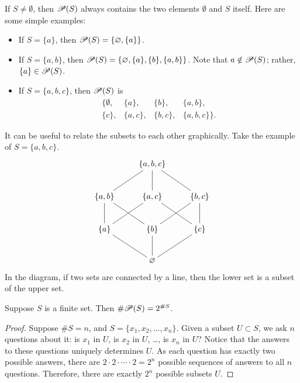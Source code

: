 \documentclass{tufte-book}
\begin{document}
If $S \neq \emptyset$, then $\mathscr{P}(S)$ always contains the two elements $\emptyset$ and $S$ itself. Here are some simple examples:
\begin{itemize}
    \item If $S = \{a\}$, then $\mathscr{P}(S) = \{\varnothing, \{a\}\}$.
    \item If $S = \{a, b\}$, then $\mathscr{P}(S) = \{\varnothing, \{a\}, \{b\}, \{a, b\}\}$. Note that $a \notin \mathscr{P}(S)$; rather, $\{a\} \in \mathscr{P}(S)$.
    \item If $S = \{a, b, c\}$, then $\mathscr{P}(S)$ is
  \[
  \begin{array}{cccc}
    \{\emptyset, & \{a\}, & \{b\}, & \{a, b\}, \\
    \{c\}, & \{a, c\}, & \{b, c\}, & \{a, b, c\}\}.
  \end{array}
  \]
\end{itemize}
It can be useful to relate the subsets to each other graphically. Take the example of $S = \{a, b, c\}$. 
\[
\xymatrix{
  & \{a, b, c\} \ar@{-}[dl] \ar@{-}[d] \ar@{-}[dr] & \\
  \{a, b\} \ar@{-}[d] \ar@{-}[dr] & \{a, c\} \ar@{-}[dl] \ar@{-}[dr] & \{b, c\} \ar@{-}[dl] \ar@{-}[d]\\
  \{a\} \ar@{-}[dr] & \{b\} \ar@{-}[d] & \{c\} \ar@{-}[dl] \\
  & \emptyset &
}
\]
In the diagram, if two sets are connected by a line, then the lower set is a subset of the upper set.

\begin{proposition}
  Suppose $S$ is a finite set. Then $\# \mathscr{P}(S) = 2^{\# S}$.
\end{proposition}

\begin{proof}
  Suppose $\# S = n$, and $S = \{x_1, x_2, \dots, x_n\}$. Given a subset $U \subset S$, we ask $n$ questions about it: is $x_1$ in $U$, is $x_2$ in $U$, \dots, is $x_n$ in $U$? Notice that the answers to these questions uniquely determines $U$. As each question has exactly two possible answers, there are $2 \cdot 2 \cdot \cdots \cdot 2 = 2^n$ possible sequences of answers to all $n$ questions. Therefore, there are exactly $2^n$ possible subsets $U$.
\end{proof}
\end{document}
